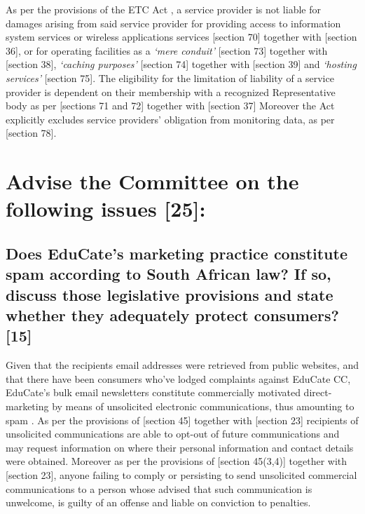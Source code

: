 \documentclass[11pt]{article}
\begin{document}
As per the provisions of the ETC Act \cite{rsa02_elect_comm_trans_act}, a service
provider is not liable for damages arising from said service provider for
providing access to information system services or wireless applications
services [section 70]\cite{rsa02_elect_comm_trans_act} together with [section
36]\cite{rsa12_elect_comm_trans_amend_bill}, or for operating facilities as a
\emph{`mere conduit'} [section 73]\cite{rsa02_elect_comm_trans_act} together with
[section 38]\cite{rsa12_elect_comm_trans_amend_bill}, \emph{`caching purposes'}
[section 74]\cite{rsa02_elect_comm_trans_act} together with [section
39]\cite{rsa12_elect_comm_trans_amend_bill} and \emph{`hosting services'} [section
75]\cite{rsa02_elect_comm_trans_act}. The eligibility for the limitation of
liability of a service provider is dependent on their membership with a
recognized Representative body as per [sections 71 and
72]\cite{rsa02_elect_comm_trans_act} together with [section
37]\cite{rsa12_elect_comm_trans_amend_bill} Moreover the Act explicitly excludes
service providers' obligation from monitoring data, as per [section
78]\cite{rsa02_elect_comm_trans_act}.

\section{Advise the Committee on the following issues [25]:}
\label{sec:org0064538}

\subsection{Does EduCate's marketing practice constitute spam according to South African law? If so, discuss those legislative provisions and state whether they adequately protect consumers? [15]}
\label{sec:org7d0ee75}

Given that the recipients email addresses were retrieved from public websites,
and that there have been consumers who've lodged complaints against EduCate CC,
EduCate's bulk email newsletters constitute commercially motivated
direct-marketing by means of unsolicited electronic communications, thus
amounting to spam
\cite{hermann14_direct_marketing_vs_spam,tladi08_reg_unsol_comm}. As per the
provisions of [section 45]\cite{rsa02_elect_comm_trans_act} together with [section
23]\cite{rsa12_elect_comm_trans_amend_bill} recipients of unsolicited
communications are able to opt-out of future communications and may request
information on where their personal information and contact details were
obtained. Moreover as per the provisions of [section
45(3,4)]\cite{rsa02_elect_comm_trans_act} together with [section
23]\cite{rsa12_elect_comm_trans_amend_bill}, anyone failing to comply or
persisting to send unsolicited commercial communications to a person whose
advised that such communication is unwelcome, is guilty of an offense and liable
on conviction to penalties.\\
\end{document}
